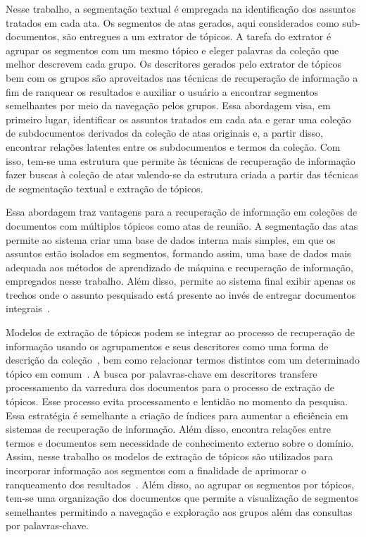 Nesse trabalho, a segmentação textual é empregada na identificação dos assuntos tratados em cada ata. Os segmentos de atas gerados, aqui considerados como sub-documentos, são entregues a um extrator de tópicos. A tarefa do extrator é agrupar os segmentos com um mesmo tópico e eleger palavras da coleção que melhor descrevem cada grupo. Os descritores gerados pelo extrator de tópicos bem com os grupos são aproveitados nas técnicas de recuperação de informação a fim de ranquear os resultados e auxiliar o usuário a encontrar segmentos semelhantes por meio da navegação pelos grupos. Essa abordagem visa, em primeiro lugar, identificar os assuntos tratados em cada ata e gerar uma coleção de subdocumentos derivados da coleção de atas originais e, a partir disso, encontrar relações latentes entre os subdocumentos e termos da coleção. Com isso, tem-se uma estrutura que permite às técnicas de recuperação de informação fazer buscas à coleção de atas valendo-se da estrutura criada a partir das técnicas de segmentação textual e extração de tópicos. 





%
%
Essa abordagem traz vantagens para a recuperação de informação em coleções de documentos com múltiplos tópicos como atas de reunião.
A segmentação das atas permite ao sistema criar uma base de dados interna mais simples, em que os assuntos estão isolados em segmentos, formando assim, uma base de dados mais adequada aos métodos de aprendizado de máquina e recuperação de informação, empregados nesse trabalho. Além disso, permite ao sistema final exibir apenas os trechos onde o assunto pesquisado está presente ao invés de entregar documentos integrais~\cite{Tagarelli2013, Jeong:2010, Prince2007, Huang2003}. 
%


Modelos de extração de tópicos podem se integrar ao processo de recuperação de informação usando os agrupamentos e seus descritores como uma forma de descrição da coleção~\cite{Zhai2017, Xing2009}, bem como relacionar termos distintos com um determinado tópico em comum~\cite{WEIXING}.  
A busca por palavras-chave em descritores transfere processamento da varredura dos documentos para o processo de extração de tópicos. Esse processo evita processamento e lentidão no momento da pesquisa. Essa estratégia é semelhante a criação de índices para aumentar a eficiência em sistemas de recuperação de informação. Além disso, encontra relações entre termos e documentos sem necessidade de conhecimento externo sobre o domínio.
%
Assim, nesse trabalho os modelos de extração de tópicos são utilizados para incorporar informação aos segmentos com a finalidade de aprimorar o ranqueamento dos resultados~\cite{Maracini2010, WEIXING}. 
% 
Além disso, ao agrupar os segmentos por tópicos, tem-se uma organização dos documentos que permite a visualização de segmentos semelhantes permitindo a navegação e exploração aos grupos além das consultas por palavras-chave.
%



